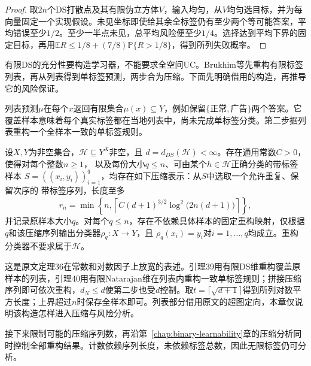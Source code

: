 \begin{proof}
取$2n$个DS打散点及其有限伪立方体$V$，输入均匀，从$V$均匀选目标，并为每向量固定一个实现假设。未见坐标即使给其余全标签仍有至少两个等可能答案，平均错误至少$1/2$。至少一半点未见，总平均风险便至少$1/4$。选择达到平均下界的固定目标，再用$\mathbb E R\leq1/8+(7/8)\mathbb P\{R>1/8\}$，得到所列失败概率。
\end{proof}

有限DS的充分性要构造学习器，不能要求全空间UC。Brukhim等先重构有限标签列表，再从列表得到单标签预测，两步合为压缩。下面先明确借用的构造，再推导它的风险保证。

列表预测$\mu$在每个$x$返回有限集合$\mu(x)\subseteq Y$，例如保留$\{\text{正常},\text{广告}\}$两个答案。它覆盖样本意味着每个真实标签都在当地列表中，尚未完成单标签分类。第二步据列表重构一个全样本一致的单标签规则。

\begin{lemma}[有限DS维的压缩构造]
\label{lem:finite-ds-compression}
设$X,Y$为非空集合，$\mathcal H\subseteq Y^X$非空，且
$d=d_{DS}(\mathcal H)<\infty$。存在通用常数$C>0$，使得对每个整数$n\geq1$，
以及每份大小$q\leq n$、可由某个$h\in\mathcal H$正确分类的带标签样本
$S=((x_i,y_i))_{i=1}^q$，均存在如下压缩表示：从$S$中选取一个允许重复、保留次序的
带标签序列，长度至多
\[
 r_n=\min\!\left\{n,\left\lceil
 C(d+1)^{3/2}\log^2\!\bigl(2n(d+1)\bigr)\right\rceil\right\},
\]
并记录原样本大小$q$。对每个$q\leq n$，存在不依赖具体样本的固定重构映射，仅根据
$q$和该压缩序列输出分类器$\rho_q:X\to Y$，且
$\rho_q(x_i)=y_i$对$i=1,\ldots,q$均成立。重构分类器不要求属于$\mathcal H$。
\end{lemma}

这是原文定理36在常数和对数因子上放宽的表述。引理39用有限DS维重构覆盖原样本的列表，引理40用有限Natarajan维在列表内重构一致单标签规则；拼接压缩序列即可依次重构，$d_N\leq d$使第二步也受$d$控制。取$t=\lceil\sqrt{d+1}\rceil$得到所列对数平方长度；上界超过$n$时保存全样本即可。列表部分借用原文的超图定向，本章仅说明该构造怎样进入压缩与风险分析。

接下来限制可能的压缩序列数，再沿第~\ref{chap:binary-learnability}章的压缩分析同时控制全部重构结果。计数依赖序列长度，未依赖标签总数，因此无限标签仍可分析。

